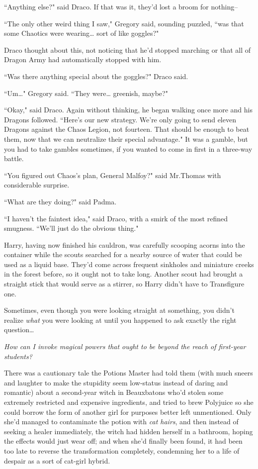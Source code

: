 ``Anything else?" said Draco. If that was it, they'd lost a broom for nothing\---

``The only other weird thing I saw," Gregory said, sounding puzzled, ``was that some Chaotics were wearing{\ldots} sort of like goggles?"

Draco thought about this, not noticing that he'd stopped marching or that all of Dragon Army had automatically stopped with him.

``Was there anything special about the goggles?" Draco said.

``Um{\ldots}" Gregory said. ``They were{\ldots} greenish, maybe?"

``Okay," said Draco. Again without thinking, he began walking once more and his Dragons followed. ``Here's our new strategy. We're only going to send eleven Dragons against the Chaos Legion, not fourteen. That should be enough to beat them, now that we can neutralize their special advantage." It was a gamble, but you had to take gambles sometimes, if you wanted to come in first in a three-way battle.

``You figured out Chaos's plan, General Malfoy?" said Mr.\?Thomas with considerable surprise.

``What are they doing?" said Padma.

``I haven't the faintest idea," said Draco, with a smirk of the most refined smugness. ``We'll just do the obvious thing."

\later

Harry, having now finished his cauldron, was carefully scooping acorns into the container while the scouts searched for a nearby source of water that could be used as a liquid base. They'd come across frequent sinkholes and miniature creeks in the forest before, so it ought not to take long. Another scout had brought a straight stick that would serve as a stirrer, so Harry didn't have to Transfigure one.

Sometimes, even though you were looking straight at something, you didn't realize \emph{what} you were looking at until you happened to ask exactly the right question{\ldots}

\emph{How can I invoke magical powers that ought to be beyond the reach of first-year students?}

There was a cautionary tale the Potions Master had told them (with much sneers and laughter to make the stupidity seem low-status instead of daring and romantic) about a second-year witch in Beauxbatons who'd stolen some extremely restricted and expensive ingredients, and tried to brew Polyjuice so she could borrow the form of another girl for purposes better left unmentioned. Only she'd managed to contaminate the potion with \emph{cat hairs}, and then instead of seeking a healer immediately, the witch had hidden herself in a bathroom, hoping the effects would just wear off; and when she'd finally been found, it had been too late to reverse the transformation completely, condemning her to a life of despair as a sort of cat-girl hybrid.

